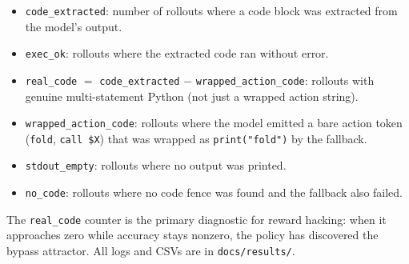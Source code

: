 \documentclass{article}
\begin{document}
\begin{itemize}
  \item \texttt{code\_extracted}: number of rollouts where a code block
    was extracted from the model's output.
  \item \texttt{exec\_ok}: rollouts where the extracted code ran without
    error.
  \item \texttt{real\_code} $=$ \texttt{code\_extracted}
    $-$ \texttt{wrapped\_action\_code}: rollouts with genuine
    multi-statement Python (not just a wrapped action string).
  \item \texttt{wrapped\_action\_code}: rollouts where the model emitted
    a bare action token (\texttt{fold}, \texttt{call \$X}) that was
    wrapped as \texttt{print("fold")} by the fallback.
  \item \texttt{stdout\_empty}: rollouts where no output was printed.
  \item \texttt{no\_code}: rollouts where no code fence was found and
    the fallback also failed.
\end{itemize}

The \texttt{real\_code} counter is the primary diagnostic for reward
hacking: when it approaches zero while accuracy stays nonzero, the
policy has discovered the bypass attractor.
All logs and CSVs are in \texttt{docs/results/}.
\end{document}
